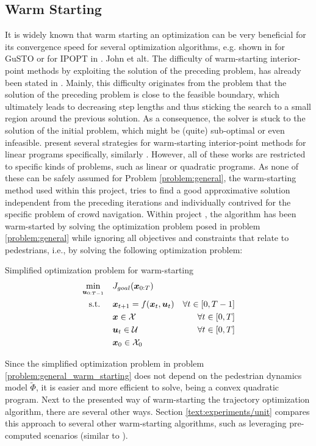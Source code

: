 \subsection{Warm Starting}
\label{text:approach/runtime/warm_starting}
It is widely known that warm starting an optimization can be very beneficial for its convergence speed for several optimization algorithms, e.g. shown in \cite{Banerjee2020} for \ac{GuSTO} or for \ac{IPOPT} in \cite{Spielberge2019}. John et alt. The difficulty of warm-starting interior-point methods by exploiting the solution of the preceding problem, has already been stated in \cite{Wright1997}\cite{Gondzio2008}. Mainly, this difficulty originates from the problem that the solution of the preceding problem is close to the feasible boundary, which ultimately leads to decreasing step lengths and thus sticking the search to a small region around the previous solution. As a consequence, the solver is stuck to the solution of the initial problem, which might be (quite) sub-optimal or even infeasible. \cite{John2008} present several strategies for warm-starting interior-point methods for linear programs specifically, similarly \cite{Shahzad2010}\cite{Gondzio2008}. However, all of these works are restricted to specific kinds of problems, such as linear or quadratic programs. As none of these can be safely assumed for Problem \ref{problem:general}, the warm-starting method used within this project, tries to find a good approximative solution independent from the preceding iterations and individually contrived for the specific problem of crowd navigation.
\newline
Within project \project, the algorithm has been warm-started by solving the optimization problem posed in problem \ref{problem:general} while ignoring all objectives and constraints that relate to pedestrians, i.e., by solving the following optimization problem: \\

\begin{problem}{Simplified optimization problem for warm-starting}
\begin{align}
\min_{\boldsymbol{u}_{0:T-1}} \quad & J_{goal}(\boldsymbol{x}_{0:T}) \\
\textrm{s.t. } \quad & \boldsymbol{x}_{t+1} = f(\boldsymbol{x}_t, \boldsymbol{u}_t) & \forall t \in [0, T - 1] \\
& \boldsymbol{x} \in \mathcal{X} & \forall t \in [0, T]\\
& \boldsymbol{u}_t \in \mathcal{U} & \forall t \in [0, T]\\
& \boldsymbol{x}_0 \in \mathcal{X}_0
\end{align}
\label{problem:general_warm_starting}
\end{problem}

Since the simplified optimization problem in problem \ref{problem:general_warm_starting} does not depend on the pedestrian dynamics model $\tilde{\Phi}$, it is easier and more efficient to solve, being a convex quadratic program. Next to the presented way of warm-starting the trajectory optimization algorithm, there are several other ways. Section \ref{text:experiments/unit} compares this approach to several other warm-starting algorithms, such as leveraging pre-computed scenarios (similar to \cite{Merkt2018}).